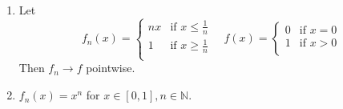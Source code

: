\documentclass[a4paper,11pt]{article}
\begin{document}
\begin{example}\
    \begin{enumerate}
        \item Let 
        \[
            f_n(x) = \begin{cases}
            nx &\text{if }x\le \frac{1}{n}\\
            1 &\text{if }x\ge \frac{1}{n}\\
            \end{cases} \quad f(x) = \begin{cases}
            0 &\text{if }x=0\\
            1 &\text{if }x>0\\
            \end{cases} 
        \]
        Then $f_n\to f$ pointwise. 
        \item $f_{n}(x)=x^{n}$ for $x \in[0,1], n \in \mathbb{N}$.
        

\end{enumerate}
\end{example}
\end{document}
